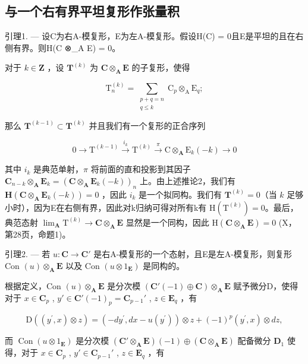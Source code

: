 \subsection{与一个右有界平坦复形作张量积}

引理1. --- 设C为右A-模复形，E为左A-模复形。假设H(C) = 0且E是平坦的且在右侧有界。则H(C ⊗\_A E) = 0。

对于 \(k \in \mathbf{Z}\) ，设 \(\mathbf{T}^{(k)}\) 为 \(\mathbf{C} \otimes_{\mathbf{A}} \mathbf{E}\) 的子复形，使得

\[
\mathrm{T}_{n}^{(k)} = \sum_{\substack{p + q = n\\ q\leqslant k}}\mathrm{C}_{p}\otimes_{\mathrm{A}}\mathrm{E}_{q};
\]

那么 \(\mathbf{T}^{(k - 1)}\subset \mathbf{T}^{(k)}\) 并且我们有一个复形的正合序列

\[
0 \longrightarrow \mathrm{T} ^ {(k - 1)} \stackrel {i _ {k}} {\longrightarrow} \mathrm{T} ^ {(k)} \stackrel {\pi} {\longrightarrow} \mathrm{C} \otimes_ {\mathbf {A}} \mathrm{E} _ {k} (- k) \longrightarrow 0
\]

其中 \(i_{k}\) 是典范单射，\(\pi\) 将前面的直和投影到其因子 \(\mathbf{C}_{n-k} \otimes_{\mathbf{A}} \mathbf{E}_{k} = (\mathbf{C} \otimes_{\mathbf{A}} \mathbf{E}_{k}(-k))_{n}\) 上。由上述推论2，我们有 \(\mathbf{H}(\mathbf{C} \otimes_{\mathbf{A}} \mathbf{E}_{k}(-k)) = 0\) ，因此 \(i_{k}\) 是一个拟同构。我们有 \(\mathbf{T}^{(k)} = 0\)（当 \(k\) 足够小时），因为E在右侧有界，因此对k归纳可得对所有k有 \(\mathrm{H}(\mathrm{T}^{(k)}) = 0\)。最后，典范态射 \(\lim_{\mathbf{A}} \mathrm{T}^{(k)} \to \mathbf{C} \otimes_{\mathbf{A}} \mathbf{E}\) 显然是一个同构，因此 \(\mathrm{H}(\mathbf{C} \otimes_{\mathbf{A}} \mathbf{E}) = 0\) (X，第28页，命题1)。

引理2. --- 若 \(u: \mathbf{C} \to \mathbf{C}'\) 是右A-模复形的一个态射，且E是左A-模复形，则复形Con \((u) \otimes_{\mathbf{A}} \mathbf{E}\) 以及 Con \((u \otimes 1_{\mathbf{E}})\) 是同构的。

根据定义，Con \((u) \otimes_{\mathbf{A}} \mathbf{E}\) 是分次模 \((\mathbf{C}'(-1) \oplus \mathbf{C}) \otimes_{\mathbf{A}} \mathbf{E}\) 赋予微分D，使得对于 \(x \in \mathbf{C}_p\) , \(y' \in \mathbf{C}'(-1)_p = \mathbf{C}_{p-1}'\) , \(z \in \mathbf{E}_q\) ，有

\[
\mathrm{D} ((y ^ {\prime}, x) \otimes z) = (- d y ^ {\prime}, d x - u (y ^ {\prime})) \otimes z + (- 1) ^ {p} (y ^ {\prime}, x) \otimes d z,\tag{4}
\]

而 \(\operatorname{Con}(u \otimes 1_{\mathbf{E}})\) 是分次模 \((\mathbf{C}' \otimes_{\mathbf{A}} \mathbf{E})(-1) \oplus (\mathbf{C} \otimes_{\mathbf{A}} \mathbf{E})\) 配备微分 \(\mathbf{D}_1\) 使得，对于 \(x \in \mathbf{C}_p\) , \(y' \in \mathbf{C}_{p-1}'\) , \(z \in \mathbf{E}_q\) ，有


